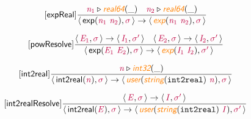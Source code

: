 \documentclass[10pt,leqno,fleqn]{article}
\newcommand{\artVariable}[1]{\mbox{\color{purple}\em #1\/}}
\newcommand{\artConstructor}[1]{\mbox{\sf #1}}
\newcommand{\artCaseInsensitiveLiteral}[1]{\mbox{\tt #1}}
\newcommand{\artSpecial}[1]{\mbox{\color{orange}\sf\em #1}}
\begin{document}
\begin{equation}
\tag*{[\artConstructor{\sf expReal}]}
\begin{split}\frac{ \artVariable{n$_{1}$}\triangleright \artSpecial{real64}(\_) \quad  \artVariable{n$_{2}$}\triangleright \artSpecial{real64}(\_) }{\langle\, \artConstructor{\sf exp}(\artVariable{n$_{1}$}\ \artVariable{n$_{2}$}), \artVariable{$\sigma$}\,\rangle \rightarrow \langle\, \artSpecial{exp}(\artVariable{n$_{1}$}\ \artVariable{n$_{2}$}), \artVariable{$\sigma$}\,\rangle }
\end{split}
\end{equation}

\begin{equation}
\tag*{[\artConstructor{\sf powResolve}]}
\begin{split}\frac{\langle\, \artVariable{E$_{1}$}, \artVariable{$\sigma$}\,\rangle \rightarrow \langle\, \artVariable{I$_{1}$}, \artVariable{$\sigma$\/$^\prime$}\,\rangle \quad \langle\, \artVariable{E$_{2}$}, \artVariable{$\sigma$}\,\rangle \rightarrow \langle\, \artVariable{I$_{2}$}, \artVariable{$\sigma$\/$^\prime$}\,\rangle }{\langle\, \artConstructor{\sf exp}(\artVariable{E$_{1}$}\ \artVariable{E$_{2}$}), \artVariable{$\sigma$}\,\rangle \rightarrow \langle\, \artSpecial{exp}(\artVariable{I$_{1}$}\ \artVariable{I$_{2}$}), \artVariable{$\sigma$\/$^\prime$}\,\rangle }
\end{split}
\end{equation}

\begin{equation}
\tag*{[\artConstructor{\sf int2real}]}
\begin{split}\frac{ \artVariable{n}\triangleright \artSpecial{int32}(\_) }{\langle\, \artConstructor{\sf int2real}(\artVariable{n}), \artVariable{$\sigma$}\,\rangle \rightarrow \langle\, \artSpecial{user}(\artSpecial{string}(\artCaseInsensitiveLiteral{int2real})\ \artVariable{n}), \artVariable{$\sigma$}\,\rangle }
\end{split}
\end{equation}

\begin{equation}
\tag*{[\artConstructor{\sf int2realResolve}]}
\begin{split}\frac{\langle\, \artVariable{E}, \artVariable{$\sigma$}\,\rangle \rightarrow \langle\, \artVariable{I}, \artVariable{$\sigma$\/$^\prime$}\,\rangle }{\langle\, \artConstructor{\sf int2real}(\artVariable{E}), \artVariable{$\sigma$}\,\rangle \rightarrow \langle\, \artSpecial{user}(\artSpecial{string}(\artCaseInsensitiveLiteral{int2real})\ \artVariable{I}), \artVariable{$\sigma$\/$^\prime$}\,\rangle }
\end{split}
\end{equation}
\end{document}
